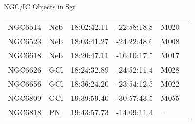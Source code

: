 \begin{block}{NGC/IC Objects in Sgr}
  \centering
  \begin{tabularx}{\textwidth}{llrrll} 
    NGC6514 & Neb & 18:02:42.11 & -22:58:18.8  & M020 \\ 
    NGC6523 & Neb & 18:03:41.27 & -24:22:48.6  & M008 \\ 
    NGC6618 & Neb & 18:20:47.11 & -16:10:17.5  & M017 \\ 
    NGC6626 & GCl & 18:24:32.89 & -24:52:11.4  & M028 \\ 
    NGC6656 & GCl & 18:36:24.20 & -23:54:12.3  & M022 \\ 
    NGC6809 & GCl & 19:39:59.40 & -30:57:43.5  & M055 \\ 
    NGC6818 & PN & 19:43:57.73 & -14:09:11.4  & -- \\ 
  \end{tabularx}
\end{block}